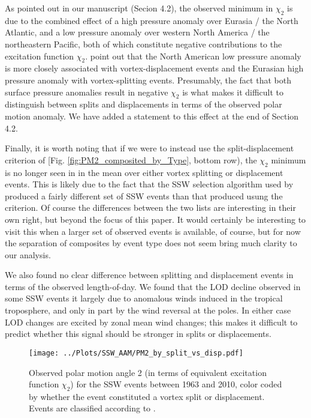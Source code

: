 \documentclass[a4paper,10pt]{article}
\begin{document}
As pointed out in our manuscript (Secion 4.2), the observed minimum in $\chi_2$ is due to the combined effect of a high pressure anomaly over Eurasia / the North Atlantic, and a low pressure anomaly over western North America / the northeastern Pacific, both of which constitute negative contributions to the excitation function $\chi_2$. 
\citet{Mitchell2012} point out that the North American low pressure anomaly is more closely associated with vortex-displacement events and the Eurasian high pressure anomaly with vortex-splitting events.
Presumably, the fact that both surface pressure anomalies result in negative $\chi_2$ is what makes it difficult to distinguish between splits and displacements in terms of the observed polar motion anomaly.
We have added a statement to this effect at the end of Section 4.2.

Finally, it is worth noting that if we were to instead use the split-displacement criterion of \citet{Mitchell2012} [Fig. \ref{fig:PM2_composited_by_Type}, bottom row), the $\chi_2$ minimum is no longer seen in in the mean over either vortex splitting or displacement events.
This is likely due to the fact that the SSW selection algorithm used by \citet{Mitchell2012} produced a fairly different set of SSW events than that produced usung the \citet{Charlton2007} criterion.  
Of course the differences between the two lists are interesting in their own right, but beyond the focus of this paper.  
It would certainly be interesting to visit this when a larger set of observed events is available, of course, but for now the separation of composites by event type does not seem bring much clarity to our analysis.


We also found no clear difference between splitting and displacement events in terms of the observed length-of-day.   
We found  that the LOD decline observed in some SSW events it largely due to anomalous winds induced in the tropical troposphere, and only in part by the wind reversal at the poles.
In either case LOD changes are excited by zonal mean wind changes; this makes it difficult to predict whether this signal should be stronger in splits or displacements.
\vspace{0.5cm}



\begin{figure}
  \noindent
\texttt{[image: ../Plots/SSW\_AAM/PM2\_by\_split\_vs\_disp.pdf]}
   \caption{Observed polar motion angle 2 (in terms of equivalent excitation function $\chi_2$) for the SSW events between 1963 and 2010, color coded by whether the event constituted a vortex split or displacement. Events are classified according to \cite{Charlton2007}.}
   \label{fig:PM2_by_Type}
 \end{figure}
\end{document}
